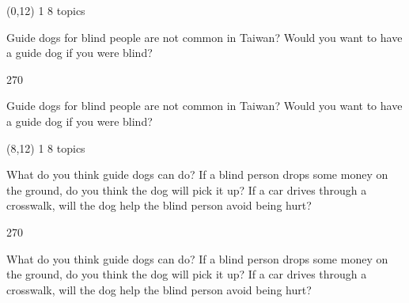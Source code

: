 \documentclass[a4paper]{article}
\newenvironment{itemize*}%
{\begin{itemize}%
 \setlength{\itemsep}{0.5cm}%
 \setlength{\parsep}{0pt}%
 \setlength{\parskip}{0pt}}%
{\end{itemize}}
\newcommand{\mycard}[3]{%
	\small #1 #2
	\par
	\parbox[t][6.8cm][c]{9.5cm}{%
	\par
	\myleft{#3}
	\par
	\myright{#3}
	}
}
\newcommand{\myleft}[1]{%
	\begin{sideways}
	\hspace*{-0.9cm}
		\parbox[t][2.7cm][t]{6.5cm}{%
		\large #1
		}
	\end{sideways}
}
\newcommand{\myright}[1]{%
	\hspace*{6.5cm}
	\begin{turn}{270}
	\hspace*{-7.1cm}
		\parbox[t][2.7cm][t]{6.5cm}{%
		\large #1
		}
	\end{turn}
}
\begin{document}
\begin{textblock}{8}(0,12)
\mycard{1}{8 topics}{
\begin{itemize*}
\item Guide dogs for blind people are not common in Taiwan? Would you want to have a guide dog if you were blind?
\end{itemize*}
}
\end{textblock}

\begin{textblock}{8}(8,12)
\mycard{1}{8 topics}{
\begin{itemize*}
\item What do you think guide dogs can do? If a blind person drops some money on the ground, do you think the dog will pick it up? If a car drives through a crosswalk, will the dog help the blind person avoid being hurt?
\end{itemize*}
}
\end{textblock}

\null
\newpage
\end{document}
